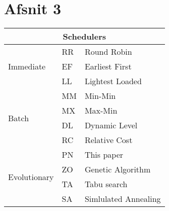 \documentclass{article}
\begin{document}
\section{Afsnit 3}

\begin{tabular}{|l|l|l|} \hline
\multicolumn{3}{|c|}{Schedulers} \\ \hline
\multirow{3}{*}{Immediate} & RR & Round Robin \\
& EF & Earliest First \\
& LL & Lightest Loaded \\ \hline
\multirow{4}{*}{Batch} & MM & Min-Min \\ 
& MX & Max-Min \\
& DL & Dynamic Level \\ 
& RC & Relative Cost \\ \hline
\multirow{4}{*}{Evolutionary} & PN & This paper \\
& ZO & Genetic Algorithm\\
& TA & Tabu search~\cite{GLOV1986j}\\
& SA & Simlulated Annealing \\ \hline
\end{tabular}
\end{document}
